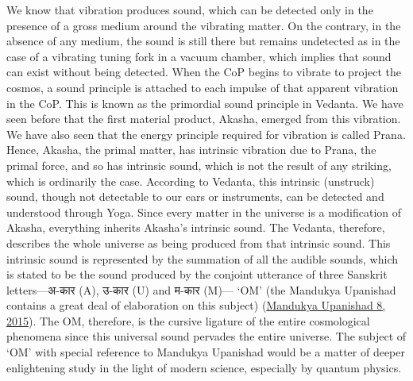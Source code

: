 \documentclass[twoside, 13pt]{article}
\begin{document}
{{\fontsize{12}{14}\selectfont We know that vibration produces sound, which can be detected only in the presence of a gross medium around the vibrating matter. On the contrary, in the absence of any medium, the sound is still there but remains undetected as in the case of a vibrating tuning fork in a vacuum chamber, which implies that sound can exist without being detected. When the CoP begins to vibrate to project the cosmos, a sound principle is attached to each impulse of that apparent vibration in the CoP. This is known as the primordial sound principle in Vedanta. We have seen before that the first material product, Akasha, emerged from this vibration. We have also seen that the energy principle required for vibration is called Prana. Hence, Akasha, the primal matter, has intrinsic vibration due to Prana, the primal force, and so has intrinsic sound, which is not the result of any striking, which is ordinarily the case. According to Vedanta, this intrinsic (unstruck) sound, though not detectable to our ears or instruments, can be detected and understood through Yoga. Since every matter in the universe is a modification of Akasha, everything inherits Akasha’s intrinsic sound. The Vedanta, therefore, describes the whole universe as being produced from that intrinsic sound. This intrinsic sound is represented by the summation of all the audible sounds, which is stated to be the sound produced by the conjoint utterance of three Sanskrit letters—\foreignlanguage{hindi}{{\fontsize{9}{11}\selectfont अ-कार }}(A), \foreignlanguage{hindi}{{\fontsize{9}{11}\selectfont उ-कार }}(U) and \foreignlanguage{hindi}{{\fontsize{6}{8}\selectfont म-कार}} (M)— ‘OM’ (the Mandukya Upanishad contains a great deal of elaboration on this subject) (\underline{Mandukya Upanishad 8, 2015}). The OM, therefore, is the cursive ligature of the entire cosmological phenomena since this universal sound pervades the entire universe. The subject of ‘OM’ with special reference to Mandukya Upanishad would be a matter of deeper enlightening study in the light of modern science, especially by quantum physics. }

}
\end{document}
